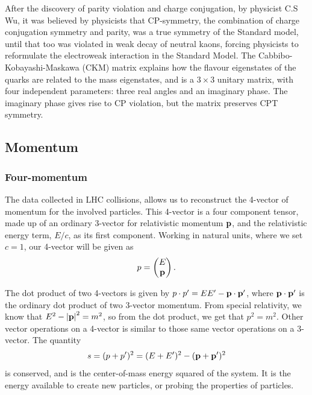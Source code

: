 \documentclass[12pt,a4paper]{article}
\numberwithin{equation}{section}
\begin{document}
After the discovery of parity violation and charge conjugation, by physicist C.S
Wu\cite{PhysRev.105.1413}, it was believed by physicists that CP-symmetry, the
combination of charge conjugation symmetry and parity, was a true symmetry of
the Standard model, until that too was violated in weak decay of neutral kaons,
forcing physicists to reformulate the electroweak interaction in the Standard
Model. The Cabbibo-Kobayashi-Maskawa (CKM) matrix explains how the flavour
eigenstates of the quarks are related to the mass eigenstates, and is a $3 \times 3$
unitary matrix, with four independent parameters: three real angles and an
imaginary phase\cite[153]{Povh2015}. The imaginary phase gives rise to CP
violation, but the matrix preserves CPT symmetry.

\subsection{Momentum}\label{sec:momentum}

\subsubsection{Four-momentum}
The data collected in LHC collisions, allows us to reconstruct the 4-vector of
momentum for the involved particles. This 4-vector is a four component tensor,
made up of an ordinary 3-vector for relativistic momentum $\vb p$, and the
relativistic energy term, $E/c$, as its first component. Working in natural
units, where we set $c=1$, our 4-vector will be given as
\begin{equation}
p = \left(\begin{matrix} E \\ \vb p \end{matrix} \right).
\end{equation}

The dot product of two 4-vectors is given by $p\cdot p' = E E' - \vb p \cdot \vb{p'}$,
where $\vb p \cdot \vb{p'}$ is the ordinary dot product of two 3-vector momentum.
From special relativity, we know that $E^2 - \abs{\vb p}^2 = m^2$, so from the
dot product, we get that $p^2 = m^2$. Other vector operations on a 4-vector is
similar to those same vector operations on a 3-vector. The quantity
\begin{equation}
s = (p + p')^2 = (E + E')^2 - (\vb p + \vb p')^2
\end{equation}
is conserved, and is the center-of-mass energy squared of the system. It is the
energy available to create new particles, or probing the properties of
particles.
\end{document}
